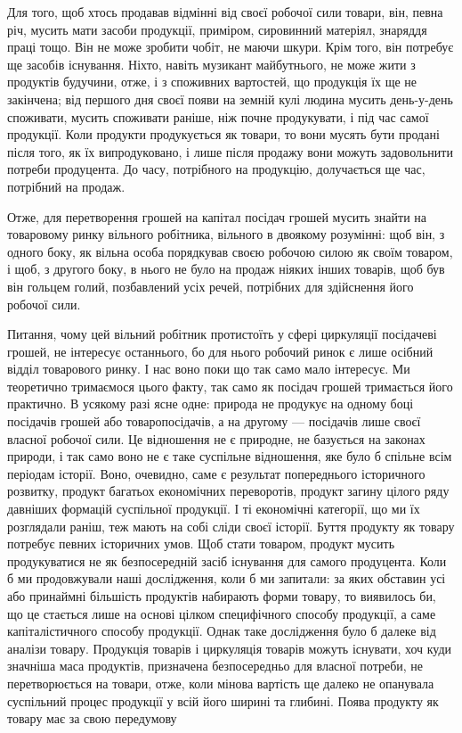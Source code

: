 
Для того, щоб хтось продавав відмінні від своєї робочої сили
товари, він, певна річ, мусить мати засоби продукції, приміром,
сировинний матеріял, знаряддя праці тощо. Він не може зробити
чобіт, не маючи шкури. Крім того, він потребує ще засобів існування.
Ніхто, навіть музикант майбутнього, не може жити з
продуктів будучини, отже, і з споживних вартостей, що продукція
їх ще не закінчена; від першого дня своєї появи на земній
кулі людина мусить день-у-день споживати, мусить споживати
раніше, ніж почне продукувати, і під час самої продукції. Коли
продукти продукується як товари, то вони мусять бути продані
після того, як їх випродуковано, і лише після продажу вони
можуть задовольнити потреби продуцента. До часу, потрібного
на продукцію, долучається ще час, потрібний на продаж.

Отже, для перетворення грошей на капітал посідач грошей
мусить знайти на товаровому ринку вільного робітника, вільного
в двоякому розумінні: щоб він, з одного боку, як вільна особа
порядкував своєю робочою силою як своїм товаром, і щоб, з
другого боку, в нього не було на продаж ніяких інших товарів,
щоб був він гольцем голий, позбавлений усіх речей, потрібних
для здійснення його робочої сили.

Питання, чому цей вільний робітник протистоїть у сфері
циркуляції посідачеві грошей, не інтересує останнього, бо для
нього робочий ринок є лише осібний відділ товарового ринку.
І нас воно поки що так само мало інтересує. Ми теоретично тримаємося
цього факту, так само як посідач грошей тримається
його практично. В усякому разі ясне одне: природа не продукує
на одному боці посідачів грошей або товаропосідачів, а на другому
— посідачів лише своєї власної робочої сили. Це відношення
не є природне, не базується на законах природи, і так само воно
не є таке суспільне відношення, яке було б спільне всім періодам
історії. Воно, очевидно, саме є результат попереднього історичного
розвитку, продукт багатьох економічних переворотів, продукт
загину цілого ряду давніших формацій суспільної продукції.
І ті економічні категорії, що ми їх розглядали раніш, теж
мають на собі сліди своєї історії. Буття продукту як товару
потребує певних історичних умов. Щоб стати товаром, продукт
мусить продукуватися не як безпосередній засіб існування для
самого продуцента. Коли б ми продовжували наші дослідження,
коли б ми запитали: за яких обставин усі або принаймні більшість
продуктів набирають форми товару, то виявилось би, що це
стається лише на основі цілком специфічного способу продукції,
а саме капіталістичного способу продукції. Однак таке дослідження
було б далеке від аналізи товару. Продукція товарів і циркуляція
товарів можуть існувати, хоч куди значніша маса продуктів,
призначена безпосередньо для власної потреби, не перетворюється
на товари, отже, коли мінова вартість ще далеко не
опанувала суспільний процес продукції у всій його ширині та
глибині. Поява продукту як товару має за свою передумову
\parbreak{}  %
